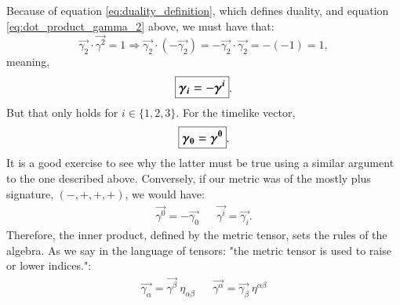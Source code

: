 Because of equation \eqref{eq:duality_definition}, which defines duality, and equation \eqref{eq:dot_product_gamma_2} above, we must have that:
$$    \vec{\gamma_2} \cdot \vec{\gamma^2} = 1 \Longrightarrow \vec{\gamma_2} \cdot (-\vec{\gamma_2} )= - \vec{\gamma_2} \cdot \vec{\gamma_2} =  -(-1) = 1, $$
meaning,
\begin{equation}
    \large\boxed{\vec{\gamma_i} = - \vec{\gamma^i}}. 
\end{equation}
But that only holds for $i \in \{ 1, 2,3\}$. For the timelike vector, 
\begin{equation}
    \large\boxed{\vec{\gamma_0} =  \vec{\gamma^0}}.  
\end{equation}
It is a good exercise to see why the latter must be true using a similar argument to the one described above. Conversely, if our metric was of the mostly plus signature, $(-, +, +, +)$, we would have:
\begin{align*}
    \vec{\gamma^0} = - \vec{\gamma_0 } && \vec{\gamma^i} = \vec{ \gamma_i}.
\end{align*}
Therefore, the inner product, defined by the metric tensor, sets the rules of the algebra. As we say in the language of tensors: "the metric tensor is used to raise or lower indices.":
\begin{align*}
\vec{\gamma_\alpha} = \vec{\gamma^\beta } \ \eta_{\alpha \beta} && 
\vec{\gamma^\alpha} = \vec{\gamma_\beta } \ \eta^{\alpha \beta} 
\end{align*}


